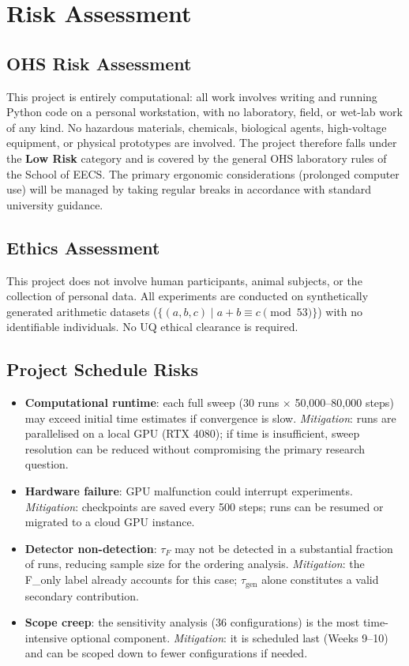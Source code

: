 \documentclass[12pt,openany,a4paper]{book}
\newcommand{\taug}{\tau_{\mathrm{gen}}}
\newcommand{\tauf}{\tau_{F}}
\begin{document}
\section{Risk Assessment}

\subsection{OHS Risk Assessment}

This project is entirely computational: all work involves writing and
running Python code on a personal workstation, with no laboratory,
field, or wet-lab work of any kind.
No hazardous materials, chemicals, biological agents, high-voltage
equipment, or physical prototypes are involved.
The project therefore falls under the \textbf{Low Risk} category
and is covered by the general OHS laboratory rules of the School
of EECS.
The primary ergonomic considerations (prolonged computer use) will be
managed by taking regular breaks in accordance with standard university
guidance.

\subsection{Ethics Assessment}

This project does not involve human participants, animal subjects,
or the collection of personal data.
All experiments are conducted on synthetically generated arithmetic
datasets ($\{(a,b,c) \mid a+b \equiv c \pmod{53}\}$) with no
identifiable individuals.
No UQ ethical clearance is required.

\subsection{Project Schedule Risks}

\begin{itemize}
  \item \textbf{Computational runtime}: each full sweep (30 runs
    $\times$ 50{,}000--80{,}000 steps) may exceed initial time
    estimates if convergence is slow.
    \textit{Mitigation}: runs are parallelised on a local GPU (RTX 4080);
    if time is insufficient, sweep resolution can be reduced without
    compromising the primary research question.
  \item \textbf{Hardware failure}: GPU malfunction could interrupt
    experiments.
    \textit{Mitigation}: checkpoints are saved every 500 steps; runs
    can be resumed or migrated to a cloud GPU instance.
  \item \textbf{Detector non-detection}: $\tauf$ may not be detected
    in a substantial fraction of runs, reducing sample size for the
    ordering analysis.
    \textit{Mitigation}: the F\_only label already accounts for this
    case; $\taug$ alone constitutes a valid secondary contribution.
  \item \textbf{Scope creep}: the sensitivity analysis (36 configurations)
    is the most time-intensive optional component.
    \textit{Mitigation}: it is scheduled last (Weeks 9--10) and can
    be scoped down to fewer configurations if needed.
\end{itemize}
\end{document}
